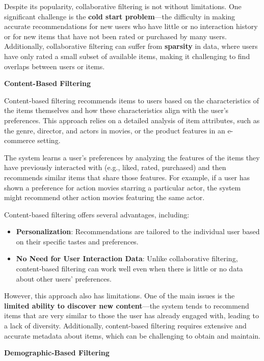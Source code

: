 \documentclass{article}
\begin{document}
Despite its popularity, collaborative filtering is not without limitations. One significant challenge is the \textbf{cold start problem}—the difficulty in making accurate recommendations for new users who have little or no interaction history or for new items that have not been rated or purchased by many users. Additionally, collaborative filtering can suffer from \textbf{sparsity} in data, where users have only rated a small subset of available items, making it challenging to find overlaps between users or items.

\textbf{Content-Based Filtering}

Content-based filtering recommends items to users based on the characteristics of the items themselves and how these characteristics align with the user's preferences. This approach relies on a detailed analysis of item attributes, such as the genre, director, and actors in movies, or the product features in an e-commerce setting.

The system learns a user's preferences by analyzing the features of the items they have previously interacted with (e.g., liked, rated, purchased) and then recommends similar items that share those features. For example, if a user has shown a preference for action movies starring a particular actor, the system might recommend other action movies featuring the same actor.

Content-based filtering offers several advantages, including:

\begin{itemize}
    \item \textbf{Personalization}: Recommendations are tailored to the individual user based on their specific tastes and preferences.
    \item \textbf{No Need for User Interaction Data}: Unlike collaborative filtering, content-based filtering can work well even when there is little or no data about other users' preferences.
\end{itemize}

However, this approach also has limitations. One of the main issues is the \textbf{limited ability to discover new content}—the system tends to recommend items that are very similar to those the user has already engaged with, leading to a lack of diversity. Additionally, content-based filtering requires extensive and accurate metadata about items, which can be challenging to obtain and maintain.

\textbf{Demographic-Based Filtering}
\end{document}

